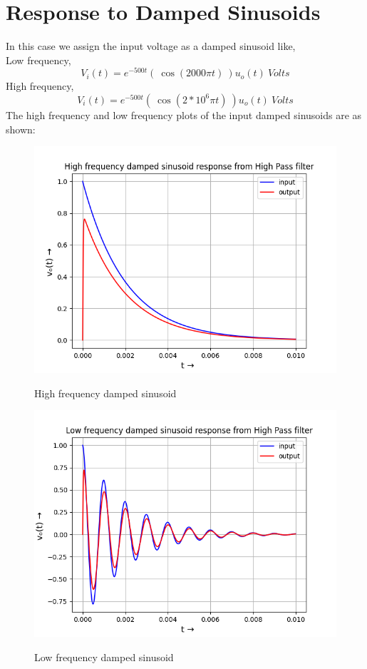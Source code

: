 \documentclass[11pt, a4paper]{article}
\begin{document}
\section*{Response to Damped Sinusoids}
In this case we assign the input voltage as a damped sinusoid like,\\
Low frequency,
\begin{equation*}
    V_{i}(t) = e^{-500t}( \ \cos(2000\pi t) \ )u_{o}(t) \ Volts
\end{equation*}
High frequency,
\begin{equation*}
    V_{i}(t) = e^{-500t}( \ \cos(2*10^{6}\pi t) \ )u_{o}(t) \ Volts
\end{equation*}
The high frequency and low frequency plots of the input damped sinusoids are as shown:\newpage
\begin{figure}[!tbh]
   	\centering
   	\includegraphics[width=1.0\textwidth]{Ass7_Figure_4.png}
   	\label{fig:32}
   	\caption{High frequency damped sinusoid}
   \end{figure}
\begin{figure}[!tbh]
   	\centering
   	\includegraphics[width=1.0\textwidth]{Ass7_Figure_5.png}
   	\label{fig:32}
   	\caption{Low frequency damped sinusoid}
   \end{figure}
   
\end{document}
